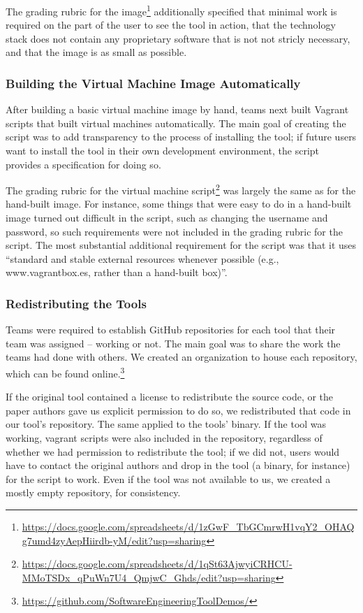 \documentclass{sig-alternate-05-2015}
\begin{document}
The grading rubric for the image\footnote{\url{https://docs.google.com/spreadsheets/d/1zGwF_TbGCmrwH1vqY2_OHAQg7umd4zyAepHiirdb-yM/edit?usp=sharing}}
additionally specified that minimal work is required
on the part of the user to see the tool in action,
that the technology stack does not contain any proprietary 
software that is not not stricly necessary,
and that the image is as small as possible.


\subsubsection{Building the Virtual Machine Image Automatically}

After building a basic virtual machine image by hand,
teams next built Vagrant scripts that built virtual machines
automatically.
The main goal of creating the script was to add 
transparency to the process
of installing the tool; if future users want to install the tool
in their own development environment, the script provides a
specification for doing so.

The grading rubric for the virtual machine 
script\footnote{\url{https://docs.google.com/spreadsheets/d/1qSt63AjwyiCRHCU-MMoTSDx_qPuWn7U4_QmjwC_Ghds/edit?usp=sharing}}
was largely the same as for the hand-built image.
For instance, some things that were easy to do in a hand-built 
image turned out difficult in the script, such as changing 
the username and password, so such requirements were 
not included in the grading rubric for the script.
The most substantial additional requirement for the script
was that it uses ``standard and stable external resources 
whenever possible (e.g., www.vagrantbox.es, rather than a 
hand-built box)''.

\subsubsection{Redistributing the Tools}

Teams were required to establish GitHub repositories 
for each tool that their team was assigned -- working or not.
The main goal was to share the work the teams had 
done with others.
We created an organization to house each repository,
which can be found 
online.\footnote{\url{https://github.com/SoftwareEngineeringToolDemos/}}

If the original tool contained a license to redistribute
the source code, or the paper authors gave us explicit
permission to do so, we redistributed that code 
in our tool's repository.
The same applied to the tools' binary.
If the tool was working, 
vagrant scripts were also included in the repository,
regardless of whether we had permission to redistribute
the tool; if we did not, users would have to contact the 
original authors and drop in the tool (a binary, for instance)
for the script to work.
Even if the tool was not available to us, we created
a mostly empty repository, for consistency.
\end{document}
